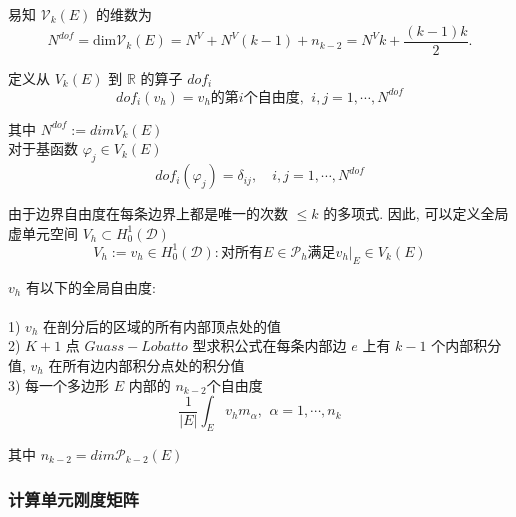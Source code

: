     易知 $\mathcal V_k(E)$ 的维数为 \\
    \begin{equation}
    N^{dof} = \text{dim} \mathcal V_k(E) = N^V + N^V(k - 1) + n_{k - 2} = N^Vk+ \frac{(k-1)k}{2}.
    \end{equation}
    
    定义从 $V_k(E)$ 到 $\mathbb{R}$ 的算子 $dof_i$ \\
    \begin{equation}
    dof_{i}(v_h) = v_h \text{的第} i \text{个自由度}, \,\ i,j = 1,\cdots, N^{dof} 
    \end{equation}
    
    其中 $N^{dof} := dimV_k(E)$ \\
    
    对于基函数 $\varphi_j \in V_k(E)$ \\
    \begin{equation}
    dof_{i}(\varphi_j) = \delta_{ij},\quad i,j = 1,\cdots,N^{dof} 
    \end{equation}
    
    由于边界自由度在每条边界上都是唯一的次数 $\le k$ 的多项式. 因此, 可以定义全局虚单元空间 $V_h \subset H_0^1(\mathcal D)$ \\
    \begin{equation*}
    V_h := {v_h \in H_0^1(\mathcal D) : \text{对所有} E\in\mathcal{P}_h \text{满足} v_h|_E \in V_k(E)}
    \end{equation*}
    
    $v_h$ 有以下的全局自由度: \\
    \\
    1) $v_h$ 在剖分后的区域的所有内部顶点处的值 \\
    2) $K + 1$ 点 $Guass-Lobatto$ 型求积公式在每条内部边 $e$ 上有 $k - 1$ 个内部积分值, $v_h$ 在所有边内部积分点处的积分值 \\  
    3) 每一个多边形 $E$ 内部的 $n_{k - 2}$个自由度\\
    \begin{equation}
    \frac{1}{|E|}\int_{E}v_hm_{\alpha},\,\ \alpha = 1,\cdots,n_k
    \end{equation}
    
    其中 $n_{k-2} = dim\mathcal{P}_{k - 2}(E)$\\
    
   \subsubsection{计算单元刚度矩阵}
  
